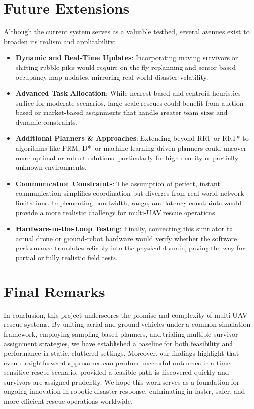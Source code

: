 \documentclass[12pt,a4paper]{report}
\begin{document}
\section{Future Extensions}
Although the current system serves as a valuable testbed, several avenues exist to
broaden its realism and applicability:
\begin{itemize}
    \item \textbf{Dynamic and Real-Time Updates}: Incorporating moving survivors or
          shifting rubble piles would require on-the-fly replanning and sensor-based
          occupancy map updates, mirroring real-world disaster volatility.
    \item \textbf{Advanced Task Allocation}: While nearest-based and centroid heuristics
          suffice for moderate scenarios, large-scale rescues could benefit from auction-based
          or market-based assignments that handle greater team sizes and dynamic constraints.
    \item \textbf{Additional Planners \& Approaches}: Extending beyond RRT or RRT*
          to algorithms like PRM, D*, or machine-learning-driven planners could
          uncover more optimal or robust solutions, particularly for high-density
          or partially unknown environments.
    \item \textbf{Communication Constraints}: The assumption of perfect, instant
          communication simplifies coordination but diverges from real-world
          network limitations. Implementing bandwidth, range, and latency constraints
          would provide a more realistic challenge for multi-UAV rescue operations.
    \item \textbf{Hardware-in-the-Loop Testing}: Finally, connecting this simulator
          to actual drone or ground-robot hardware would verify whether the software
          performance translates reliably into the physical domain, paving the way
          for partial or fully realistic field tests.
\end{itemize}

\section{Final Remarks}
In conclusion, this project underscores the promise and complexity of multi-UAV rescue
systems. By uniting aerial and ground vehicles under a common simulation framework,
employing sampling-based planners, and trialing multiple survivor assignment strategies,
we have established a baseline for both feasibility and performance in static, cluttered
settings. Moreover, our findings highlight that even straightforward approaches can
produce successful outcomes in a time-sensitive rescue scenario, provided a feasible
path is discovered quickly and survivors are assigned prudently. We hope this work
serves as a foundation for ongoing innovation in robotic disaster response, culminating
in faster, safer, and more efficient rescue operations worldwide.
\end{document}
